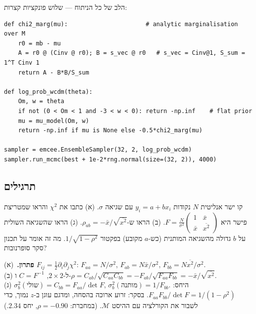 הלב של כל הניתוח --- שלוש פונקציות קצרות:
\begin{otherlanguage}{english}
\begin{lstlisting}
def chi2_marg(mu):                      # analytic marginalisation over M
    r0 = mb - mu
    A = r0 @ (Cinv @ r0); B = s_vec @ r0   # s_vec = Cinv@1, S_sum = 1^T Cinv 1
    return A - B*B/S_sum

def log_prob_wcdm(theta):
    Om, w = theta
    if not (0 < Om < 1 and -3 < w < 0): return -np.inf    # flat prior
    mu = mu_model(Om, w)
    return -np.inf if mu is None else -0.5*chi2_marg(mu)

sampler = emcee.EnsembleSampler(32, 2, log_prob_wcdm)
sampler.run_mcmc(best + 1e-2*rng.normal(size=(32, 2)), 4000)
\end{lstlisting}
\end{otherlanguage}

\subsection*{תרגילים}
\begin{exercise}{קו ישר אנליטית}
$N$ נקודות $y_i=a+bx_i$ עם שגיאה $\sigma$. (א) כתבו את $\chi^2$ והראו שמטריצת פישר היא $F=\frac{N}{\sigma^2}\begin{pmatrix}1&\bar x\\ \bar x&\overline{x^2}\end{pmatrix}$. (ב) הראו ש-$\rho_{ab}=-\bar x/\sqrt{\overline{x^2}}$. (ג) הראו שהשגיאה השולית על $b$ גדולה מהשגיאה המותנית (כש-$a$ מקובע) בפקטור $1/\sqrt{1-\rho^2}$. מה זה אומר על תכנון סקר סופרנובות?
\end{exercise}
\begin{solbox}
\textbf{פתרון.}\ (א) $F_{ij}=\tfrac12\partial_i\partial_j\chi^2$: $F_{aa}=N/\sigma^2$, $F_{ab}=N\bar x/\sigma^2$, $F_{bb}=N\overline{x^2}/\sigma^2$.\\
(ב) ל-$2\times2$, $C=F^{-1}$ ו-$\rho=C_{ab}/\sqrt{C_{aa}C_{bb}}=-F_{ab}/\sqrt{F_{aa}F_{bb}}=-\bar x/\sqrt{\overline{x^2}}$.\\
(ג) $\sigma_b^2(\text{שולי})=C_{bb}=F_{aa}/\det F$, $\sigma_b^2(\text{מותנה})=1/F_{bb}$. היחס: $F_{aa}F_{bb}/\det F=1/(1-\rho^2)$. בסקר: זרוע ארוכה בהסחה, ומדגם עוגן ב-$z$ נמוך, כדי לשבור את הקורלציה עם ההיסט $\mathcal M$. (במחברת: $\rho=-0.90$, יחס $2.34$.)
\end{solbox}


